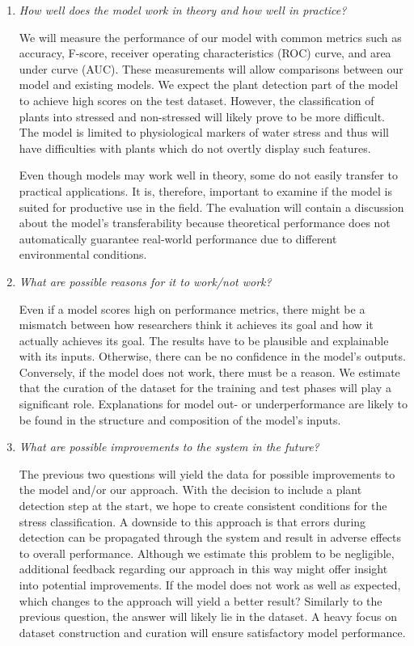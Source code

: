 \documentclass[draft,final]{vutinfth} %
\begin{document}
\begin{enumerate}
\item \emph{How well does the model work in theory and how well in
    practice?}

  We will measure the performance of our model with
  common metrics such as accuracy, F-score, receiver operating
  characteristics (ROC) curve, and area under curve (AUC). These
  measurements will allow comparisons between our model and existing
  models. We expect the plant detection part of the model to achieve
  high scores on the test dataset. However, the classification of
  plants into stressed and non-stressed will likely prove to be more
  difficult. The model is limited to physiological markers of water
  stress and thus will have difficulties with plants which do not
  overtly display such features.

  Even though models may work well in theory, some do not easily
  transfer to practical applications. It is, therefore, important to
  examine if the model is suited for productive use in the field. The
  evaluation will contain a discussion about the model's
  transferability because theoretical performance does not
  automatically guarantee real-world performance due to different
  environmental conditions.
\item \emph{What are possible reasons for it to work/not work?}

  Even if a model scores high on performance metrics, there might be a
  mismatch between how researchers think it achieves its goal and how
  it actually achieves its goal. The results have to be plausible and
  explainable with its inputs. Otherwise, there can be no confidence
  in the model's outputs. Conversely, if the model does not work,
  there must be a reason. We estimate that the curation of the dataset
  for the training and test phases will play a significant
  role. Explanations for model out- or underperformance are likely to
  be found in the structure and composition of the model's inputs.
\item \emph{What are possible improvements to the system in the
    future?}

  The previous two questions will yield the data for possible
  improvements to the model and/or our approach. With the decision to
  include a plant detection step at the start, we hope to create
  consistent conditions for the stress classification. A downside to
  this approach is that errors during detection can be propagated
  through the system and result in adverse effects to overall
  performance. Although we estimate this problem to be negligible,
  additional feedback regarding our approach in this way might offer
  insight into potential improvements. If the model does not work as
  well as expected, which changes to the approach will yield a better
  result? Similarly to the previous question, the answer will likely
  lie in the dataset. A heavy focus on dataset construction and
  curation will ensure satisfactory model performance.
\end{enumerate}
\end{document}
